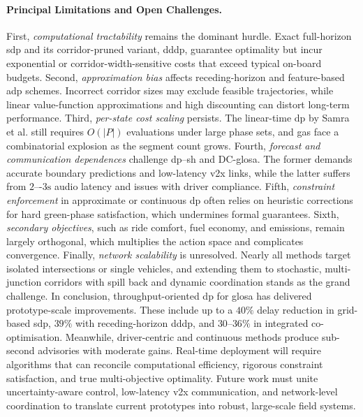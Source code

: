 \paragraph{Principal Limitations and Open Challenges.} 
First, \emph{computational tractability} remains the dominant hurdle. Exact full-horizon \ac{sdp} and its corridor-pruned variant, \ac{dddp}, guarantee optimality but incur exponential or corridor-width-sensitive costs that exceed typical on-board budgets. Second, \emph{approximation bias} affects receding-horizon and feature-based \ac{adp} schemes. Incorrect corridor sizes may exclude feasible trajectories, while linear value-function approximations and high discounting can distort long-term performance. Third, \emph{per-state cost scaling} persists. The linear-time \ac{dp} by Samra et al. still requires $O(|P|)$ evaluations under large phase sets, and \acp{ga} face a combinatorial explosion as the segment count grows. Fourth, \emph{forecast and communication dependences} challenge \ac{dp}–\ac{sh} and DC-\ac{glosa}. The former demands accurate boundary predictions and low-latency \ac{v2x} links, while the latter suffers from $2$–-$3\unit{\second}$ audio latency and issues with driver compliance. Fifth, \emph{constraint enforcement} in approximate or continuous \ac{dp} often relies on heuristic corrections for hard green-phase satisfaction, which undermines formal guarantees. Sixth, \emph{secondary objectives}, such as ride comfort, fuel economy, and emissions, remain largely orthogonal, which multiplies the action space and complicates convergence. Finally, \emph{network scalability} is unresolved. Nearly all methods target isolated intersections or single vehicles, and extending them to stochastic, multi-junction corridors with spill back and dynamic coordination stands as the grand challenge.
\mynewline
In conclusion, throughput-oriented \ac{dp} for \ac{glosa} has delivered prototype-scale improvements. These include up to a $40\%$ delay reduction in grid-based \ac{sdp}, $39\%$ with receding-horizon \ac{dddp}, and $30$--$36\%$ in integrated co-optimisation. Meanwhile, driver-centric and continuous methods produce sub-second advisories with moderate gains. Real-time deployment will require algorithms that can reconcile computational efficiency, rigorous constraint satisfaction, and true multi-objective optimality. Future work must unite uncertainty-aware control, low-latency \ac{v2x} communication, and network-level coordination to translate current prototypes into robust, large-scale field systems.